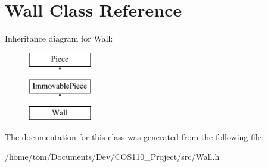 \hypertarget{classWall}{\section{Wall Class Reference}
\label{classWall}
}
Inheritance diagram for Wall\-:\begin{figure}[H]
\begin{center}
\leavevmode
\includegraphics[height=3.000000cm]{classWall}
\end{center}
\end{figure}


The documentation for this class was generated from the following file\-:\begin{DoxyCompactItemize}
\item 
/home/tom/\-Documents/\-Dev/\-C\-O\-S110\-\_\-\-Project/src/Wall.\-h\end{DoxyCompactItemize}
